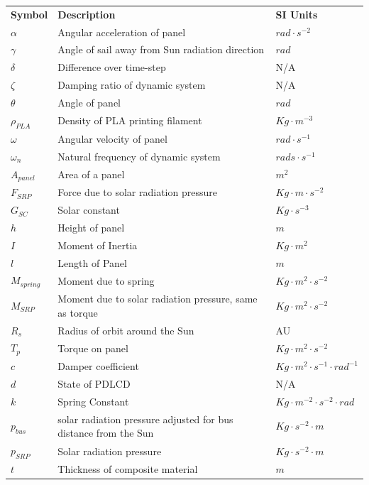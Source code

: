 \begin{tabular}{ p{1cm} p{10cm} p{5cm} }
\textbf{Symbol} & \textbf{Description} & \textbf{SI Units} \\

$\alpha$ & Angular acceleration of panel & $ rad \cdot s^{-2}$\\
$\gamma$ & Angle of sail away from Sun radiation direction & $rad $\\
$\delta$ & Difference over time-step & N/A \\
$\zeta $ & Damping ratio of dynamic system & N/A \\
$\theta$ & Angle of panel & $ rad $ \\
$\rho_{PLA}$ & Density of PLA printing filament & $Kg \cdot m^{-3}$ \\ 
$\omega$ & Angular velocity of panel & $ rad \cdot s^{-1} $\\
$\omega_n$ & Natural frequency of dynamic system & $ rads \cdot s^{-1} $ \\
$A_{panel}$ & Area of a panel & $m^2$ \\ 
$F_{SRP}$ & Force due to solar radiation pressure & $Kg \cdot m \cdot s^{-2}$ \\
$G_{SC}$ & Solar constant & $ Kg \cdot s^{-3}$ \\
$h$ & Height of panel & $m$ \\
$I$ & Moment of Inertia & $ Kg \cdot m^2$ \\
$l$ & Length of Panel & $m$ \\
$M_{spring}$ & Moment due to spring & $Kg \cdot m^2 \cdot s^{-2}$\\
$M_{SRP}$ & Moment due to solar radiation pressure, same as torque & $Kg \cdot m^{2} \cdot s^{-2}$ \\
$R_s$ & Radius of orbit around the Sun & AU \\
$T_p$ & Torque on panel & $Kg \cdot m^{2} \cdot s^{-2}$ \\
$c$ & Damper coefficient & $Kg \cdot m^2 \cdot s^{-1} \cdot rad^{-1}$ \\
$d$ & State of PDLCD & N/A \\
$k$ & Spring Constant & $ Kg \cdot m^{-2} \cdot s^{-2} \cdot rad$ \\
$p_{bus}$ & solar radiation pressure adjusted for bus distance from the Sun & $Kg \cdot s^{-2} \cdot m$ \\
$p_{SRP}$ & Solar radiation pressure & $Kg \cdot s^{-2} \cdot m$ \\
$t$ & Thickness of composite material & $m$ \\
\end{tabular}

